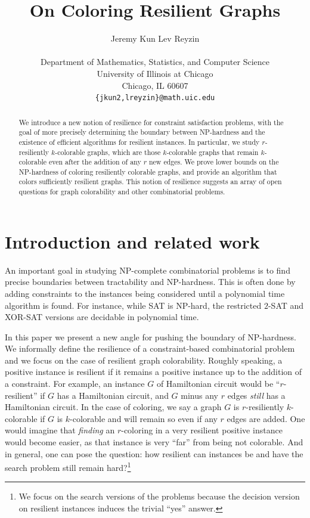 \documentclass[10pt]{article}
\title{On Coloring Resilient Graphs}
\author{Jeremy Kun \qquad Lev Reyzin\\ \\
Department of Mathematics, Statistics, and Computer Science\\
University of Illinois at Chicago\\
Chicago, IL 60607\\
\texttt{\{jkun2,lreyzin\}@math.uic.edu}
}
\date{}
\begin{document}
\maketitle

\begin{abstract} 
We introduce a new notion of resilience for constraint satisfaction problems,
with the goal of more precisely determining the boundary between NP-hardness
and the existence of efficient algorithms for resilient instances.  In
particular, we study $r$-resiliently $k$-colorable graphs, which are those
$k$-colorable graphs that remain $k$-colorable even after the addition of any
$r$ new edges.  We prove lower bounds on the NP-hardness of coloring
resiliently colorable graphs, and provide an algorithm that colors sufficiently
resilient graphs. This notion of resilience suggests an array of open
questions for graph colorability and other combinatorial problems.
\end{abstract}

\section{Introduction and related work}

An important goal in studying NP-complete combinatorial problems is to find
precise boundaries between tractability and NP-hardness. This is often done by
adding constraints to the instances being considered until a polynomial time
algorithm is found.  For instance, while SAT is NP-hard, the restricted $2$-SAT
and XOR-SAT versions are decidable in polynomial time.  

In this paper we present a new angle for pushing the boundary of NP-hardness.
We informally define the resilience of a constraint-based combinatorial problem
and we focus on the case of resilient graph colorability. Roughly speaking, a
positive instance is resilient if it remains a positive instance up to the
addition of a constraint. For example, an instance $G$ of Hamiltonian circuit
would be ``$r$-resilient'' if $G$ has a Hamiltonian circuit, and $G$ minus any
$r$ edges \emph{still} has a Hamiltonian circuit. In the case of coloring, we
say a graph $G$ is $r$-resiliently $k$-colorable if $G$ is $k$-colorable and
will remain so even if any $r$ edges are added. One would imagine that
\emph{finding} an $r$-coloring in a very resilient positive instance would
become easier, as that instance is very ``far'' from being not colorable.  And
in general, one can pose the question: how resilient can instances be and have
the search problem still remain hard?\footnote{We focus on the search versions
of the problems because the decision version on resilient instances induces the
trivial ``yes'' answer.}
\end{document}
